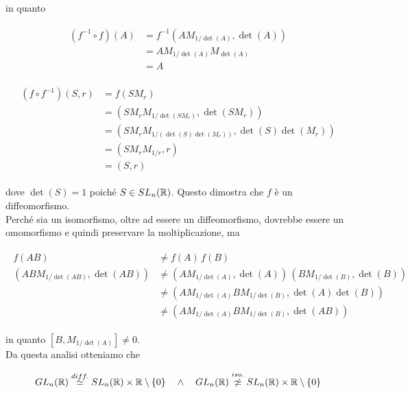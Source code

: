 in quanto

\begin{align}
	\begin{split}
		(f^{-1} \circ f)(A) &= f^{-1} \left( A M_{1/\det(A)},\det(A) \right) \\
		&= A M_{1/\det(A)} M_{\det(A)} \\
		&= A
	\end{split}
\end{align}

\begin{align}
	\begin{split}
		(f \circ f^{-1})(S,r) &= f(S M_{r}) \\
		&= \left( S M_{r} M_{{1/\det(S M_{r})}},\det(S M_{r}) \right) \\
		&= \left( S M_{r} M_{1/(\det(S) \det(M_{r}))},\det(S) \det(M_{r}) \right) \\
		&= \left( S M_{r} M_{1/r},r \right) \\
		&= (S,r)
	\end{split}
\end{align}

dove $ \det(S) = 1 $ poiché $ S \in SL_{n} (\mathbb{R}) $. Questo dimostra che $ f $ è un diffeomorfismo.\\
Perché sia un isomorfismo, oltre ad essere un diffeomorfismo, dovrebbe essere un omomorfismo e quindi preservare la moltiplicazione, ma

\begin{align}
	\begin{split}
		f(A B) &\neq f(A) \, f(B)\\
		\left( A B M_{1/\det(A B)}, \det(A B) \right) &\neq \left( A M_{1/\det(A)},\det(A) \right) \, \left( B M_{1/\det(B)},\det(B) \right) \\
		&\neq \left( A M_{1/\det(A)} B M_{1/\det(B)},\det(A) \det(B) \right) \\
		&\neq \left( A M_{1/\det(A)} B M_{1/\det(B)},\det(A B) \right)
	\end{split}
\end{align}

in quanto $ [B, M_{1/\det(A)}] \neq 0 $.\\
Da questa analisi otteniamo che

\begin{equation}
	GL_{n}(\R) \stackrel{diff.}{\simeq} SL_{n}(\R) \times \R \setminus \{0\} %
	\quad \wedge \quad %
	GL_{n}(\R) \stackrel{iso.}{\not\simeq} SL_{n}(\R) \times \R \setminus \{0\}
\end{equation}

